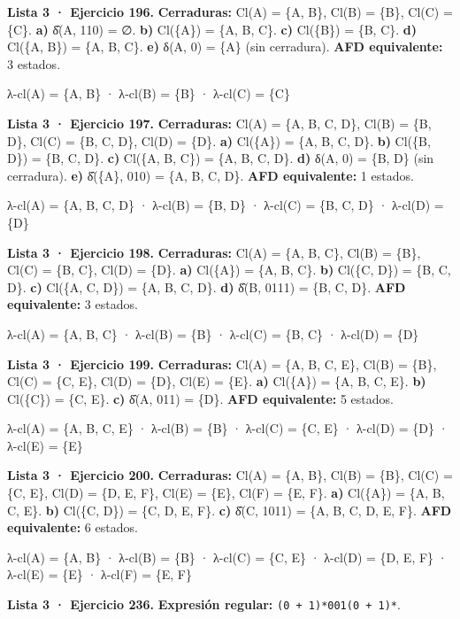 \textbf{Lista 3 · Ejercicio 196.} \textbf{Cerraduras:} Cl(A) = \{A, B\}, Cl(B) = \{B\}, Cl(C) = \{C\}. \textbf{a)} δ̂(A, 110) = ∅. \textbf{b)} Cl(\{A\}) = \{A, B, C\}. \textbf{c)} Cl(\{B\}) = \{B, C\}. \textbf{d)} Cl(\{A, B\}) = \{A, B, C\}. \textbf{e)} δ(A, 0) = \{A\} (sin cerradura). \textbf{AFD equivalente:} 3 estados.

λ-cl(A) = \{A, B\} · λ-cl(B) = \{B\} · λ-cl(C) = \{C\}

\textbf{Lista 3 · Ejercicio 197.} \textbf{Cerraduras:} Cl(A) = \{A, B, C, D\}, Cl(B) = \{B, D\}, Cl(C) = \{B, C, D\}, Cl(D) = \{D\}. \textbf{a)} Cl(\{A\}) = \{A, B, C, D\}. \textbf{b)} Cl(\{B, D\}) = \{B, C, D\}. \textbf{c)} Cl(\{A, B, C\}) = \{A, B, C, D\}. \textbf{d)} δ(A, 0) = \{B, D\} (sin cerradura). \textbf{e)} δ̂(\{A\}, 010) = \{A, B, C, D\}. \textbf{AFD equivalente:} 1 estados.

λ-cl(A) = \{A, B, C, D\} · λ-cl(B) = \{B, D\} · λ-cl(C) = \{B, C, D\} · λ-cl(D) = \{D\}

\textbf{Lista 3 · Ejercicio 198.} \textbf{Cerraduras:} Cl(A) = \{A, B, C\}, Cl(B) = \{B\}, Cl(C) = \{B, C\}, Cl(D) = \{D\}. \textbf{a)} Cl(\{A\}) = \{A, B, C\}. \textbf{b)} Cl(\{C, D\}) = \{B, C, D\}. \textbf{c)} Cl(\{A, C, D\}) = \{A, B, C, D\}. \textbf{d)} δ̂(B, 0111) = \{B, C, D\}. \textbf{AFD equivalente:} 3 estados.

λ-cl(A) = \{A, B, C\} · λ-cl(B) = \{B\} · λ-cl(C) = \{B, C\} · λ-cl(D) = \{D\}

\textbf{Lista 3 · Ejercicio 199.} \textbf{Cerraduras:} Cl(A) = \{A, B, C, E\}, Cl(B) = \{B\}, Cl(C) = \{C, E\}, Cl(D) = \{D\}, Cl(E) = \{E\}. \textbf{a)} Cl(\{A\}) = \{A, B, C, E\}. \textbf{b)} Cl(\{C\}) = \{C, E\}. \textbf{c)} δ̂(A, 011) = \{D\}. \textbf{AFD equivalente:} 5 estados.

λ-cl(A) = \{A, B, C, E\} · λ-cl(B) = \{B\} · λ-cl(C) = \{C, E\} · λ-cl(D) = \{D\} · λ-cl(E) = \{E\}

\textbf{Lista 3 · Ejercicio 200.} \textbf{Cerraduras:} Cl(A) = \{A, B\}, Cl(B) = \{B\}, Cl(C) = \{C, E\}, Cl(D) = \{D, E, F\}, Cl(E) = \{E\}, Cl(F) = \{E, F\}. \textbf{a)} Cl(\{A\}) = \{A, B, C, E\}. \textbf{b)} Cl(\{C, D\}) = \{C, D, E, F\}. \textbf{c)} δ̂(C, 1011) = \{A, B, C, D, E, F\}. \textbf{AFD equivalente:} 6 estados.

λ-cl(A) = \{A, B\} · λ-cl(B) = \{B\} · λ-cl(C) = \{C, E\} · λ-cl(D) = \{D, E, F\} · λ-cl(E) = \{E\} · λ-cl(F) = \{E, F\}

\textbf{Lista 3 · Ejercicio 236.} \textbf{Expresión regular:} \texttt{(0\ +\ 1)*001(0\ +\ 1)*}.

